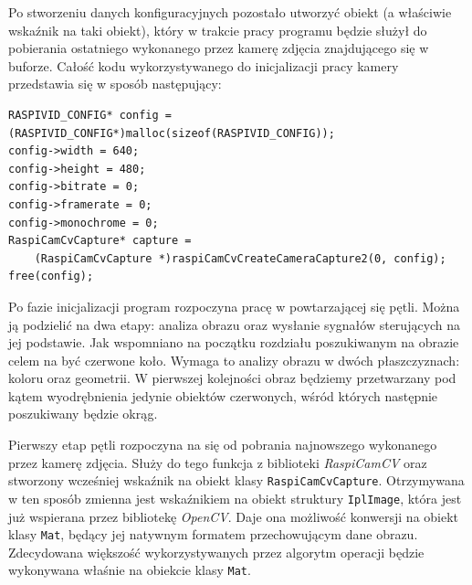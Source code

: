 Po stworzeniu danych konfiguracyjnych pozostało utworzyć obiekt (a właściwie wskaźnik na taki obiekt), który w trakcie pracy programu będzie służył do pobierania ostatniego wykonanego przez kamerę zdjęcia znajdującego się w buforze. Całość kodu wykorzystywanego do inicjalizacji pracy kamery przedstawia się w sposób następujący:
\begin{lstlisting}
RASPIVID_CONFIG* config = (RASPIVID_CONFIG*)malloc(sizeof(RASPIVID_CONFIG));
config->width = 640;
config->height = 480;
config->bitrate = 0;
config->framerate = 0;
config->monochrome = 0;
RaspiCamCvCapture* capture =
	(RaspiCamCvCapture *)raspiCamCvCreateCameraCapture2(0, config);
free(config); 
\end{lstlisting}

Po fazie inicjalizacji program rozpoczyna pracę w powtarzającej się pętli. Można ją podzielić na dwa etapy: analiza obrazu oraz wysłanie sygnałów sterujących na jej podstawie. Jak wspomniano na początku rozdziału poszukiwanym na obrazie celem na być czerwone koło. Wymaga to analizy obrazu w dwóch płaszczyznach: koloru oraz geometrii. W pierwszej kolejności obraz będziemy przetwarzany pod kątem wyodrębnienia jedynie obiektów czerwonych, wśród których następnie poszukiwany będzie okrąg.

Pierwszy etap pętli rozpoczyna na się od pobrania najnowszego wykonanego przez kamerę zdjęcia. Służy do tego funkcja z biblioteki \textit{RaspiCamCV} oraz stworzony wcześniej wskaźnik na obiekt klasy \texttt{RaspiCamCvCapture}. Otrzymywana w ten sposób zmienna jest wskaźnikiem na obiekt struktury \texttt{IplImage}, która jest już wspierana przez bibliotekę \textit{OpenCV}. Daje ona możliwość konwersji na obiekt klasy \texttt{Mat}, będący jej natywnym formatem przechowującym dane obrazu. Zdecydowana większość wykorzystywanych przez algorytm operacji będzie wykonywana właśnie na obiekcie klasy \texttt{Mat}.

